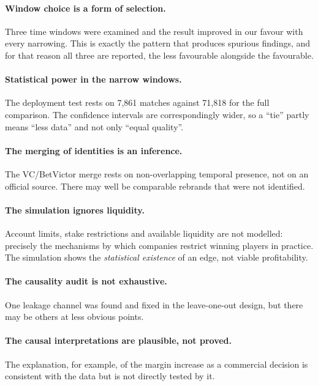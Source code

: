 \documentclass[12pt,a4paper,oneside]{report}
\renewcommand{\_}{\oldunderscore\allowbreak}
\theoremstyle{definition}
\theoremstyle{plain}
\theoremstyle{definition}   %
\begin{document}
\paragraph{Window choice is a form of selection.} Three time windows were examined and the result
improved in our favour with every narrowing. This is exactly the pattern that produces spurious
findings, and for that reason all three are reported, the less favourable alongside the
favourable.

\paragraph{Statistical power in the narrow windows.} The deployment test rests on 7,861 matches
against 71,818 for the full comparison. The confidence intervals are correspondingly wider, so a
``tie'' partly means ``less data'' and not only ``equal quality''.

\paragraph{The merging of identities is an inference.} The VC/BetVictor merge rests on
non-overlapping temporal presence, not on an official source. There may well be comparable
rebrands that were not identified.

\paragraph{The simulation ignores liquidity.} Account limits, stake restrictions and available
liquidity are not modelled: precisely the mechanisms by which companies restrict winning
players in practice. The simulation shows the \emph{statistical existence} of an edge, not
viable profitability.

\paragraph{The causality audit is not exhaustive.} One leakage channel was found and fixed in the
leave-one-out design, but there may be others at less obvious points.

\paragraph{The causal interpretations are plausible, not proved.} The explanation, for example, of
the margin increase as a commercial decision is consistent with the data but is not directly
tested by it.
\end{document}
